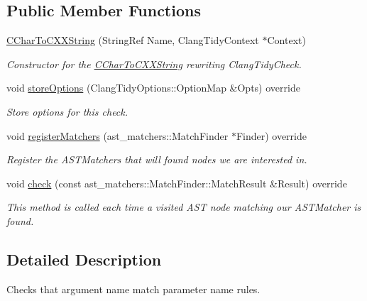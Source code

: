 \subsection*{Public Member Functions}
\begin{DoxyCompactItemize}
\item 
\hyperlink{classclang_1_1tidy_1_1pagesjaunes_1_1_c_char_to_c_x_x_string_ae4b2b5f44a0edf261c3afbf773ae909c}{C\+Char\+To\+C\+X\+X\+String} (String\+Ref Name, Clang\+Tidy\+Context $\ast$Context)
\begin{DoxyCompactList}\small\item\em Constructor for the \hyperlink{classclang_1_1tidy_1_1pagesjaunes_1_1_c_char_to_c_x_x_string}{C\+Char\+To\+C\+X\+X\+String} rewriting Clang\+Tidy\+Check. \end{DoxyCompactList}\item 
void \hyperlink{classclang_1_1tidy_1_1pagesjaunes_1_1_c_char_to_c_x_x_string_ab1991d7f4de935f7e8d1e682569aa6e4}{store\+Options} (Clang\+Tidy\+Options\+::\+Option\+Map \&Opts) override
\begin{DoxyCompactList}\small\item\em Store options for this check. \end{DoxyCompactList}\item 
void \hyperlink{classclang_1_1tidy_1_1pagesjaunes_1_1_c_char_to_c_x_x_string_ab0ef139bc40f42a606a376b6f7d41236}{register\+Matchers} (ast\+\_\+matchers\+::\+Match\+Finder $\ast$Finder) override
\begin{DoxyCompactList}\small\item\em Register the A\+S\+T\+Matchers that will found nodes we are interested in. \end{DoxyCompactList}\item 
void \hyperlink{classclang_1_1tidy_1_1pagesjaunes_1_1_c_char_to_c_x_x_string_aebfaf36f2199b0b53bbf7e1241f09b77}{check} (const ast\+\_\+matchers\+::\+Match\+Finder\+::\+Match\+Result \&Result) override
\begin{DoxyCompactList}\small\item\em This method is called each time a visited A\+ST node matching our A\+S\+T\+Matcher is found. \end{DoxyCompactList}\end{DoxyCompactItemize}


\subsection{Detailed Description}
Checks that argument name match parameter name rules. 

